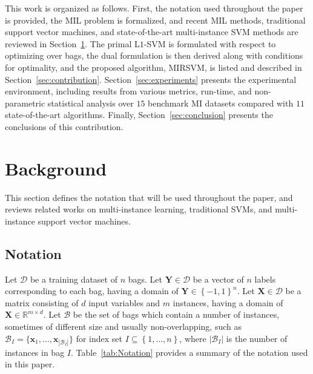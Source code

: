 \documentclass[preprint,12pt]{elsarticle}
\newcommand{\set}[1]{{\left\{#1\right\}}}
\begin{document}
This work is organized as follows. First, the notation used throughout the paper is provided, the MIL problem is formalized, and recent MIL methods, traditional support vector machines, and state-of-the-art multi-instance SVM methods are reviewed in Section~\ref{sec:background}. The primal L$1$-SVM is formulated with respect to optimizing over bags, the dual formulation is then derived along with conditions for optimality, and the proposed algorithm, MIRSVM, is listed and described in Section~\ref{sec:contribution}. Section~\ref{sec:experiments} presents the experimental environment, including results from various metrics, run-time, and non-parametric statistical analysis over $15$ benchmark MI datasets compared with $11$ state-of-the-art algorithms. Finally, Section~\ref{sec:conclusion} presents the conclusions of this contribution.

\section{Background}\label{sec:background}
This section defines the notation that will be used throughout the paper, and reviews related works on multi-instance learning, traditional SVMs, and multi-instance support vector machines.

\subsection{Notation}\label{subsec:notation}
Let $\mathcal{D}$ be a training dataset of $n$ bags. Let $\bm{Y} \in \mathcal{D}$ be a vector of $n$ labels corresponding to each bag, having a domain of $\bm{Y} \in \set{-1,1}^n$. Let $\bm{X} \in \mathcal{D}$ be a matrix consisting of $d$ input variables and $m$ instances, having a domain of $\bm{X} \in \mathbb{R}^{m \times d}$. Let $\mathcal{B}$ be the set of bags which contain a number of instances, sometimes of different size and usually non-overlapping, such as $\mathcal{B}_I = \{\bm x_{1}, \ldots, \bm x_{|\mathcal{B}_I|}\}$ for index set $I \subseteq \set{1,\ldots,n}$, where $|\mathcal{B}_I|$ is the number of instances in bag $I$. Table~\ref{tab:Notation} provides a summary of the notation used in this paper.
\end{document}
